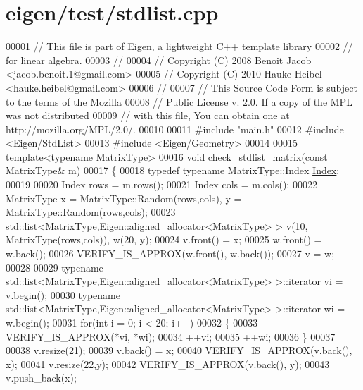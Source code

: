 \hypertarget{eigen_2test_2stdlist_8cpp_source}{}\section{eigen/test/stdlist.cpp}
\label{eigen_2test_2stdlist_8cpp_source}

\begin{DoxyCode}
00001 \textcolor{comment}{// This file is part of Eigen, a lightweight C++ template library}
00002 \textcolor{comment}{// for linear algebra.}
00003 \textcolor{comment}{//}
00004 \textcolor{comment}{// Copyright (C) 2008 Benoit Jacob <jacob.benoit.1@gmail.com>}
00005 \textcolor{comment}{// Copyright (C) 2010 Hauke Heibel <hauke.heibel@gmail.com>}
00006 \textcolor{comment}{//}
00007 \textcolor{comment}{// This Source Code Form is subject to the terms of the Mozilla}
00008 \textcolor{comment}{// Public License v. 2.0. If a copy of the MPL was not distributed}
00009 \textcolor{comment}{// with this file, You can obtain one at http://mozilla.org/MPL/2.0/.}
00010 
00011 \textcolor{preprocessor}{#include "main.h"}
00012 \textcolor{preprocessor}{#include <Eigen/StdList>}
00013 \textcolor{preprocessor}{#include <Eigen/Geometry>}
00014 
00015 \textcolor{keyword}{template}<\textcolor{keyword}{typename} MatrixType>
00016 \textcolor{keywordtype}{void} check\_stdlist\_matrix(\textcolor{keyword}{const} MatrixType& m)
00017 \{
00018   \textcolor{keyword}{typedef} \textcolor{keyword}{typename} MatrixType::Index \hyperlink{namespace_eigen_a62e77e0933482dafde8fe197d9a2cfde}{Index};
00019   
00020   Index rows = m.rows();
00021   Index cols = m.cols();
00022   MatrixType x = MatrixType::Random(rows,cols), y = MatrixType::Random(rows,cols);
00023   std::list<MatrixType,Eigen::aligned\_allocator<MatrixType> > v(10, MatrixType(rows,cols)), w(20, y);
00024   v.front() = x;
00025   w.front() = w.back();
00026   VERIFY\_IS\_APPROX(w.front(), w.back());
00027   v = w;
00028 
00029   \textcolor{keyword}{typename} std::list<MatrixType,Eigen::aligned\_allocator<MatrixType> >::iterator vi = v.begin();
00030   \textcolor{keyword}{typename} std::list<MatrixType,Eigen::aligned\_allocator<MatrixType> >::iterator wi = w.begin();
00031   \textcolor{keywordflow}{for}(\textcolor{keywordtype}{int} i = 0; i < 20; i++)
00032   \{
00033     VERIFY\_IS\_APPROX(*vi, *wi);
00034     ++vi;
00035     ++wi;
00036   \}
00037 
00038   v.resize(21);  
00039   v.back() = x;
00040   VERIFY\_IS\_APPROX(v.back(), x);
00041   v.resize(22,y);
00042   VERIFY\_IS\_APPROX(v.back(), y);
00043   v.push\_back(x);

\end{DoxyCode}
